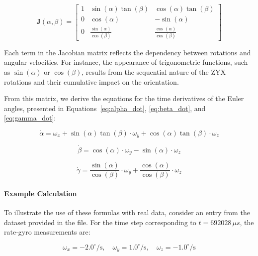 \documentclass[12pt]{article}
\begin{document}
\begin{equation}
\label{eq:jacobian_matrix}
\mathbf{J}(\alpha, \beta) =
\begin{bmatrix}
1 & \sin(\alpha) \tan(\beta) & \cos(\alpha) \tan(\beta) \\
0 & \cos(\alpha) & -\sin(\alpha) \\
0 & \frac{\sin(\alpha)}{\cos(\beta)} & \frac{\cos(\alpha)}{\cos(\beta)}
\end{bmatrix}
\end{equation}

Each term in the Jacobian matrix reflects the dependency between rotations and angular velocities. For instance, the appearance of trigonometric functions, such as \(\sin(\alpha)\) or \(\cos(\beta)\), results from the sequential nature of the ZYX rotations and their cumulative impact on the orientation.

From this matrix, we derive the equations for the time derivatives of the Euler angles, presented in Equations~\eqref{eq:alpha_dot}, \eqref{eq:beta_dot}, and \eqref{eq:gamma_dot}:

\begin{equation}
\label{eq:alpha_dot}
\dot{\alpha} = \omega_x + \sin(\alpha) \tan(\beta) \cdot \omega_y + \cos(\alpha) \tan(\beta) \cdot \omega_z
\end{equation}

\begin{equation}
\label{eq:beta_dot}
\dot{\beta} = \cos(\alpha) \cdot \omega_y - \sin(\alpha) \cdot \omega_z
\end{equation}

\begin{equation}
\label{eq:gamma_dot}
\dot{\gamma} = \frac{\sin(\alpha)}{\cos(\beta)} \cdot \omega_y + \frac{\cos(\alpha)}{\cos(\beta)} \cdot \omega_z
\end{equation}

\paragraph{Example Calculation}
To illustrate the use of these formulas with real data, consider an entry from the dataset provided in the file. For the time step corresponding to \( t = 692028 \, \mu s \), the rate-gyro measurements are:

\begin{equation}
\label{eq:rate-gyro}
\omega_x = -2.0^\circ/\text{s}, \quad \omega_y = 1.0^\circ/\text{s}, \quad \omega_z = -1.0^\circ/\text{s}
\end{equation}
\end{document}
